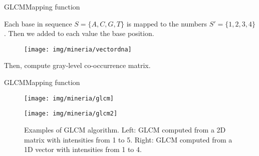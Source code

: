 \documentclass[10pt]{beamer}
\newcommand{\1}{
	\setbeamertemplate{background}{
		\texttt{[image: img/1]}
		\tikz[overlay] \fill[fill opacity=0.75,fill=white] (0,0) rectangle (-\paperwidth,\paperheight);
	}
}
\begin{document}
\begin{frame}{GLCM}{Mapping function}
	\begin{block}{}
		Each base in sequence $S = \{A, C, G, T\}$ is mapped to the numbers $S' = \{ 1, 2, 3, 4 \}$. Then we added to each value the base position. 
	\end{block}

	\begin{figure}[]
		\centering
		\texttt{[image: img/mineria/vectordna]}		
	\end{figure}

	\begin{block}{}
		Then, compute  gray-level co-occurrence matrix.
	\end{block}
\end{frame}

\begin{frame}{GLCM}{Mapping function}
	 \begin{figure}[h]
		\centering
		\begin{multicols}{2}
			\texttt{[image: img/mineria/glcm]}\par 
			\texttt{[image: img/mineria/glcm2]}\par 
		\end{multicols}
		\caption{Examples of GLCM algorithm. Left: GLCM computed from a 2D matrix with intensities from 1 to 5.  Right: GLCM computed from a 1D vector with intensities from 1 to 4.}
		\label{img:glcm}
	\end{figure}
\end{frame}
\end{document}
